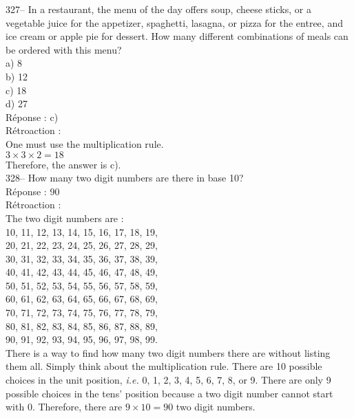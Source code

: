 \documentclass[letterpaper, 12pt]{article}
\begin{document}
327-- In a restaurant, the menu of the day offers soup, cheese sticks, or a vegetable juice for the appetizer, spaghetti,
 lasagna, or pizza for the entree, and ice cream or apple pie for dessert. How many different combinations of meals can be ordered with this menu?\\

a) 8\\
b) 12\\
c) 18\\
d) 27\\

R\'eponse : c)\\

R\'etroaction : \\
One must use the multiplication rule.\\
$3\times3\times2=18$\\
Therefore, the answer is c).\\


328-- How many two digit numbers are there in base 10?\\

R\'eponse : 90\\

R\'etroaction :\\
The two digit numbers are :\\

10, 11, 12, 13, 14, 15, 16, 17, 18, 19, \\
20, 21, 22, 23, 24, 25, 26, 27, 28, 29, \\
30, 31, 32, 33, 34, 35, 36, 37, 38, 39, \\
40, 41, 42, 43, 44, 45, 46, 47, 48, 49, \\
50, 51, 52, 53, 54, 55, 56, 57, 58, 59, \\
60, 61, 62, 63, 64, 65, 66, 67, 68, 69, \\
70, 71, 72, 73, 74, 75, 76, 77, 78, 79, \\
80, 81, 82, 83, 84, 85, 86, 87, 88, 89, \\
90, 91, 92, 93, 94, 95, 96, 97, 98, 99. \\

There is a way to find how many two digit numbers there are without
listing them all. Simply think about the multiplication rule. There
are 10 possible choices in the unit position, \emph{i.e.} 0, 1, 2,
3, 4, 5, 6, 7, 8, or 9. There are only 9 possible choices in the
tens' position because a
two digit number cannot start with 0. Therefore, there are $9\times10=90$ two digit numbers.\\
\end{document}
